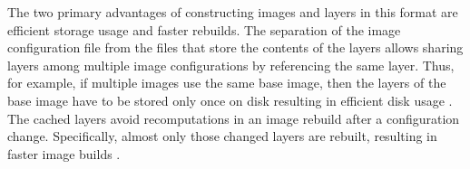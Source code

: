 The two primary advantages of constructing images and layers in this format are efficient storage usage and faster rebuilds. The separation of the image configuration file from the files that store the contents of the layers allows sharing layers among multiple image configurations by referencing the same layer. Thus, for example, if multiple images use the same base image, then the layers of the base image have to be stored only once on disk resulting in efficient disk usage \cite{DockerStorageDrivers}.
The cached layers avoid recomputations in an image rebuild after a configuration change. Specifically, almost only those changed layers are rebuilt, resulting in faster image builds \cite{dockerOverview}.

